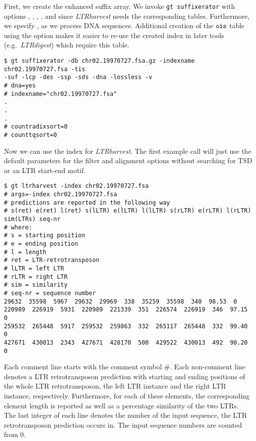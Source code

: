 \documentclass[12pt,titlepage]{article}
\newcommand{\LTRharvest}{\textit{LTRharvest}\xspace}
\newcommand{\Gtsuffixerator}{\texttt{gt suffixerator}\xspace}
\begin{document}
First, we create the enhanced suffix array. We invoke \Gtsuffixerator with
options , , , ,
 and  since \LTRharvest needs the corresponding
tables. Furthermore, we specify , as we process DNA sequences.
Additional creation of the $\tt{ois}$ table using the 
option makes it easier to re-use the created index in later tools (e.g.\
\emph{LTRdigest}) which require this table.

\begin{footnotesize}
\begin{verbatim}
$ gt suffixerator -db chr02.19970727.fsa.gz -indexname chr02.19970727.fsa -tis
-suf -lcp -des -ssp -sds -dna -lossless -v
# dna=yes
# indexname="chr02.19970727.fsa"
.
.
.
# countradixsort=0
# counttqsort=0
\end{verbatim}
\end{footnotesize}

Now we can use the index for \LTRharvest. The first example call will just use
the default parameters for the filter and alignment options
without searching for TSD or an LTR start-end motif.

\begin{footnotesize}
\begin{verbatim}
$ gt ltrharvest -index chr02.19970727.fsa
# args=-index chr02.19970727.fsa
# predictions are reported in the following way
# s(ret) e(ret) l(ret) s(lLTR) e(lLTR) l(lLTR) s(rLTR) e(rLTR) l(rLTR) sim(LTRs) seq-nr
# where:
# s = starting position
# e = ending position
# l = length
# ret = LTR-retrotransposon
# lLTR = left LTR
# rLTR = right LTR
# sim = similarity
# seq-nr = sequence number
29632  35598  5967  29632  29969  338  35259  35598  340  98.53  0
220989  226919  5931  220989  221339  351  226574  226919  346  97.15  0
259532  265448  5917  259532  259863  332  265117  265448  332  99.40  0
427671  430013  2343  427671  428170  500  429522  430013  492  90.20  0
\end{verbatim}
\end{footnotesize}

Each comment line starts with the comment symbol \#.
Each non-comment line denotes a LTR retrotransposon prediction with
starting and ending positions of the whole LTR retrotransposon, the
left LTR instance and the right LTR instance, respectively. Furthermore,
for each of these elements, the corresponding element length is reported
as well as a percentage similarity of the two LTRs. The last integer of
each line denotes the number of the input sequence, the LTR retrotransposon
prediction occurs in. The input sequence numbers are counted from 0.
\end{document}
